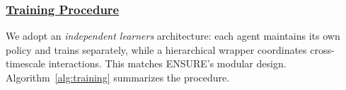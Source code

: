 \documentclass[12pt,lettersize,journal,onecolumn]{IEEEtran}
\begin{document}
%
\subsubsection{\underline{Training Procedure}}
We adopt an \textit{independent learners} architecture: each agent maintains its own policy and trains separately, while a hierarchical wrapper coordinates cross-timescale interactions. This matches ENSURE's modular design. Algorithm~\ref{alg:training} summarizes the procedure.
\end{document}
